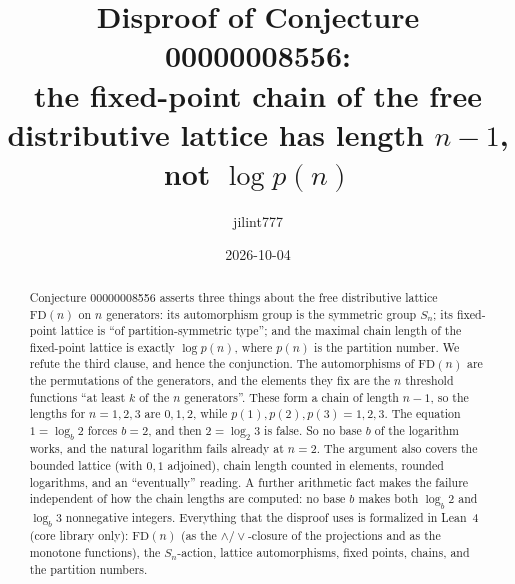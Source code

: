 \documentclass[11pt]{article}
\title{Disproof of Conjecture 00000008556:\\
the fixed-point chain of the free distributive lattice has length $n-1$, not $\log p(n)$}
\author{jilint777}
\date{2026-10-04}
\theoremstyle{definition}
\theoremstyle{remark}
\newcommand{\FD}{\mathrm{FD}}
\begin{document}
\sloppy
\maketitle

\begin{abstract}
Conjecture 00000008556 asserts three things about the free distributive lattice
$\FD(n)$ on $n$ generators: its automorphism group is the symmetric group $S_n$;
its fixed-point lattice is ``of partition-symmetric type''; and the maximal chain
length of the fixed-point lattice is exactly $\log p(n)$, where $p(n)$ is the
partition number. We refute the third clause, and hence the conjunction. The
automorphisms of $\FD(n)$ are the permutations of the generators, and the
elements they fix are the $n$ threshold functions ``at least $k$ of the $n$
generators''. These form a chain of length $n-1$, so the lengths for
$n=1,2,3$ are $0,1,2$, while $p(1),p(2),p(3)=1,2,3$. The equation
$1=\log_b 2$ forces $b=2$, and then $2=\log_2 3$ is false. So no base $b$ of
the logarithm works, and the natural logarithm fails already at $n=2$. The
argument also covers the bounded lattice (with $0,1$ adjoined), chain length
counted in elements, rounded logarithms, and an ``eventually'' reading. A further
arithmetic fact makes the failure independent of how the chain lengths are
computed: no base $b$ makes both $\log_b 2$ and $\log_b 3$ nonnegative integers.
Everything that the disproof uses is formalized in Lean~4 (core library only):
$\FD(n)$ (as the $\wedge/\vee$-closure of the projections and as the monotone
functions), the $S_n$-action, lattice automorphisms, fixed points, chains, and
the partition numbers.
\end{abstract}
\end{document}
